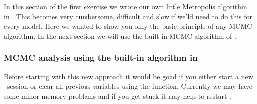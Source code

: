 In this section of the first exercise we wrote our own little Metropolis algorithm in \Rev.
This becomes very cumbersome, difficult and slow if we'ld need to do this for every model.
Here we wanted to show you only the basic principle of any MCMC algorithm.
In the next section we will use the built-in MCMC algorithm of \RevBayes.




\subsubsection*{MCMC analysis using the built-in algorithm in \RevBayes}
Before starting with this new approach it would be good if you either start a new \RevBayes~session or clear all previous variables using the  function.
Currently we may have some minor memory problems and if you get stuck it may help to restart \RevBayes.

